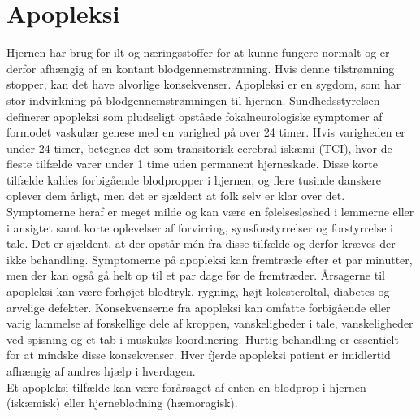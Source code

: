 \section{Apopleksi}
Hjernen har brug for ilt og næringsstoffer for at kunne fungere normalt og er derfor afhængig af en kontant blodgennemstrømning. Hvis denne tilstrømning stopper, kan det have alvorlige konsekvenser.\cite{Hjernesagen2015a} Apopleksi er en sygdom, som har stor indvirkning på blodgennemstrømningen til hjernen. Sundhedsstyrelsen definerer apopleksi som pludseligt opståede fokalneurologiske symptomer af formodet vaskulær genese med en varighed på over 24 timer.\cite{Sundhedsstyrelsen2009} Hvis varigheden er under 24 timer, betegnes det som transitorisk cerebral iskæmi (TCI), hvor de fleste tilfælde varer under 1 time uden permanent hjerneskade\cite{Sundhed.dk2014}\cite{Ritter2015}. Disse korte tilfælde kaldes forbigående blodpropper i hjernen, og flere tusinde danskere oplever dem årligt, men det er sjældent at folk selv er klar over det. Symptomerne heraf er meget milde og kan være en følelsesløshed i lemmerne eller i ansigtet samt korte oplevelser af forvirring, synsforstyrrelser og forstyrrelse i tale. Det er sjældent, at der opstår mén fra disse tilfælde og derfor kræves der ikke behandling.\cite{Hjernesagen2015a}\cite{Academic2015} 
Symptomerne på apopleksi kan fremtræde efter et par minutter, men der kan også gå helt op til et par dage før de fremtræder\cite{Kruuse2014}\cite{Academic2015}.
Årsagerne til apopleksi kan være forhøjet blodtryk, rygning, højt kolesteroltal, diabetes og arvelige defekter. Konsekvenserne fra apopleksi kan omfatte forbigående eller varig lammelse af forskellige dele af kroppen, %
vanskeligheder i tale, vanskeligheder ved spisning og et tab i muskuløs koordinering.\cite{Academic2015} Hurtig behandling er essentielt for at mindske disse konsekvenser. Hver fjerde apopleksi patient er imidlertid afhængig af andres hjælp i hverdagen.\cite{Hjernesagen2015a} \\ %
Et apopleksi tilfælde kan være forårsaget af enten en blodprop i hjernen (iskæmisk) eller hjerneblødning (hæmoragisk).\cite{Ritter2015} 

